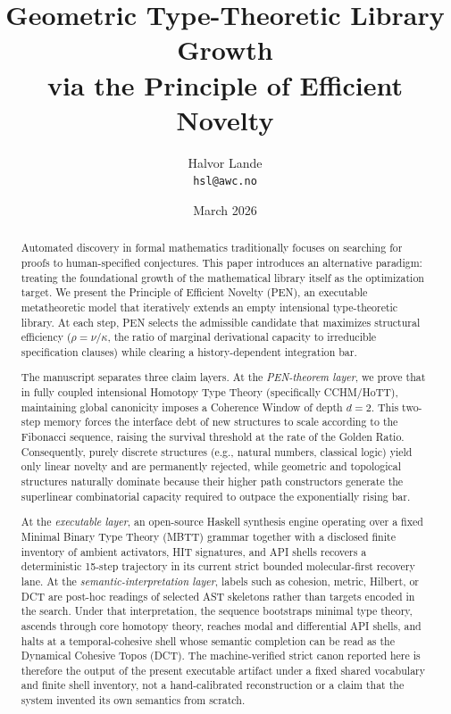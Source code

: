 \documentclass[11pt,a4paper]{article}
\title{\textbf{Geometric Type-Theoretic Library Growth\\
via the Principle of Efficient Novelty}}
\author{Halvor Lande\\
\texttt{hsl@awc.no}}
\date{March 2026}
\theoremstyle{plain}
\theoremstyle{definition}
\theoremstyle{remark}
\begin{document}
\maketitle

\begin{abstract}
Automated discovery in formal mathematics traditionally focuses on searching for proofs to human-specified conjectures. This paper introduces an alternative paradigm: treating the foundational growth of the mathematical library itself as the optimization target. We present the Principle of Efficient Novelty (PEN), an executable metatheoretic model that iteratively extends an empty intensional type-theoretic library. At each step, PEN selects the admissible candidate that maximizes structural efficiency ($\rho = \nu/\kappa$, the ratio of marginal derivational capacity to irreducible specification clauses) while clearing a history-dependent integration bar.

The manuscript separates three claim layers. At the \emph{PEN-theorem layer}, we prove that in fully coupled intensional Homotopy Type Theory (specifically CCHM/HoTT), maintaining global canonicity imposes a Coherence Window of depth $d=2$. This two-step memory forces the interface debt of new structures to scale according to the Fibonacci sequence, raising the survival threshold at the rate of the Golden Ratio. Consequently, purely discrete structures (e.g., natural numbers, classical logic) yield only linear novelty and are permanently rejected, while geometric and topological structures naturally dominate because their higher path constructors generate the superlinear combinatorial capacity required to outpace the exponentially rising bar.

At the \emph{executable layer}, an open-source Haskell synthesis engine operating over a fixed Minimal Binary Type Theory (MBTT) grammar together with a disclosed finite inventory of ambient activators, HIT signatures, and API shells recovers a deterministic 15-step trajectory in its current strict bounded molecular-first recovery lane. At the \emph{semantic-interpretation layer}, labels such as cohesion, metric, Hilbert, or DCT are post-hoc readings of selected AST skeletons rather than targets encoded in the search. Under that interpretation, the sequence bootstraps minimal type theory, ascends through core homotopy theory, reaches modal and differential API shells, and halts at a temporal-cohesive shell whose semantic completion can be read as the Dynamical Cohesive Topos (DCT). The machine-verified strict canon reported here is therefore the output of the present executable artifact under a fixed shared vocabulary and finite shell inventory, not a hand-calibrated reconstruction or a claim that the system invented its own semantics from scratch.
\end{abstract}
\end{document}
